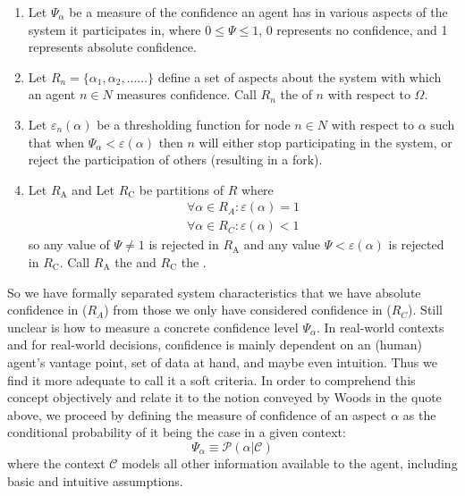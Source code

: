 \documentclass[twocolumn,showpacs,%
  nofootinbib,aps,superscriptaddress,%
  eqsecnum,prd,notitlepage,showkeys,10pt]{revtex4-1}
\begin{document}
\begin{enumerate}
\item Let $\Psi_\alpha$ be a measure of the confidence an agent has in various aspects of the system it participates in, where $0 \leq \Psi \leq 1$, 0 represents no confidence, and 1 represents absolute confidence.
\item Let $R_n = \{\alpha_1,\alpha_2,...\dots\}$ define a set of aspects about the system with which an agent $n \in N$ measures confidence.  Call $R_n$ the  of $n$ with respect to $\Omega$.
\item Let $\varepsilon_n(\alpha)$ be a thresholding function for node $n \in N$ with respect to $\alpha$ such that when $\Psi_\alpha < \varepsilon(\alpha)$ then $n$ will either stop participating in the system, or reject the participation of others (resulting in a fork).

\item  Let $R_\mathrm{A}$ and Let $R_\mathrm{C}$ be partitions of $R$ where
\begin{equation}
\begin{split}
\forall \alpha \in R_A:\varepsilon(\alpha)=1\\
\forall \alpha \in R_C:\varepsilon(\alpha)<1
\end{split}
\end{equation}
so any value of $\Psi \neq 1$ is rejected in $R_\mathrm{A}$ and any value $\Psi < \varepsilon(\alpha)$ is rejected in $R_\mathrm{C}$. Call $R_\mathrm{A}$ the  and $R_\mathrm{C}$ the .
\end{enumerate}

So we have formally separated system characteristics that we have absolute confidence in ($R_A$) from those we only have considered confidence in ($R_C$). Still unclear is how to measure a concrete confidence level $\Psi_\alpha$. In real-world contexts and for real-world decisions, confidence is mainly dependent on an (human) agent's vantage point, set of data at hand, and maybe even intuition. Thus we find it more adequate to call it a soft criteria. In order to comprehend this concept objectively and relate it to the notion conveyed by Woods in the quote above, we proceed by defining the measure of confidence of an aspect $\alpha$ as the conditional probability of it being the case in a given context:
\begin{equation}
\Psi_\alpha \equiv \mathcal{P}(\alpha | \mathcal{C})
\end{equation}
where the context $\mathcal{C}$ models all other information available to the agent, including basic and intuitive assumptions.
\end{document}
